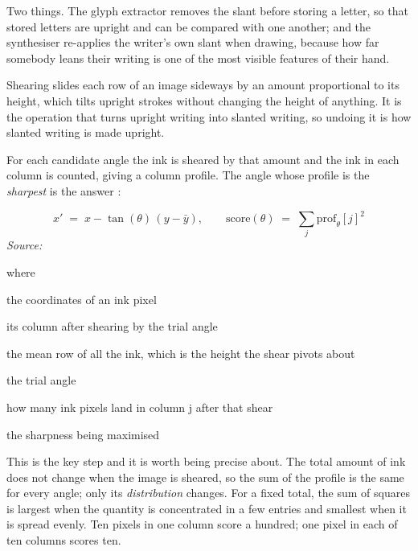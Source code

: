 Two things. The glyph extractor removes the slant before storing a letter, so that stored letters are upright and can be compared with one another; and the synthesiser re-applies the writer's own slant when drawing, because how far somebody leans their writing is one of the most visible features of their hand.


Shearing slides each row of an image sideways by an amount proportional to its height, which tilts upright strokes without changing the height of anything. It is the operation that turns upright writing into slanted writing, so undoing it is how slanted writing is made upright.


For each candidate angle the ink is sheared by that amount and the ink in each column is counted, giving a column profile. The angle whose profile is the \emph{sharpest} is the answer \cite{vinciarelli2001}:


\begin{equation}
x' \;=\; x - \tan(\theta)\,(y - \bar{y}), \qquad \mathrm{score}(\theta) \;=\; \sum_j \mathrm{prof}_\theta[j]^2
\end{equation}
\noindent\emph{Source: }\cite{vinciarelli2001}


\noindent where
\begin{description}[leftmargin=2.4em,style=nextline,font=\normalfont\ttfamily]\setlength\itemsep{1pt}
  \item[{$x,\, y$}] \normalfont the coordinates of an ink pixel
  \item[{$x'$}] \normalfont its column after shearing by the trial angle
  \item[{$\bar{y}$}] \normalfont the mean row of all the ink, which is the height the shear pivots about
  \item[{$\theta$}] \normalfont the trial angle
  \item[{$\mathrm{prof}_\theta[j]$}] \normalfont how many ink pixels land in column j after that shear
  \item[{$\mathrm{score}(\theta)$}] \normalfont the sharpness being maximised
\end{description}

This is the key step and it is worth being precise about. The total amount of ink does not change when the image is sheared, so the sum of the profile is the same for every angle; only its \emph{distribution} changes. For a fixed total, the sum of squares is largest when the quantity is concentrated in a few entries and smallest when it is spread evenly. Ten pixels in one column score a hundred; one pixel in each of ten columns scores ten.

